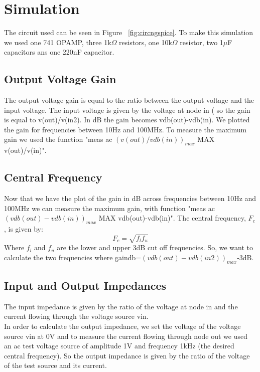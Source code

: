 \section{Simulation}
The circuit used can be seen in Figure ~\ref{fig:circngspice}. To make this simulation we used one  741 OPAMP, three 1k$\Omega$ resistors, one 10k$\Omega$ resistor, two 1$\mu$F capacitors ans one 220nF capacitor. 
\subsection{Output Voltage Gain}
The output voltage gain is equal to the ratio between the output voltage and the input voltage. The input voltage is given by the voltage at node in ( so the gain is equal to v(out)/v(in2). In dB the gain becomes vdb(out)-vdb(in). We plotted the gain for frequencies between 10Hz and 100MHz. To measure the maximum gain we used the function "meas ac $(v(out)/vdb(in))_{max}$ MAX v(out)/v(in)".
\subsection{Central Frequency}
Now that we have the plot of the gain in dB across frequencies between 10Hz and 100MHz we can measure the maximum gain, with function "meas ac $(vdb(out)-vdb(in))_{max}$ MAX vdb(out)-vdb(in)". The central frequency, $F_c$, is given by:
\begin{equation}
F_c=\sqrt{f_lf_u}
\end{equation}
Where $f_l$ and $f_u$ are the lower and upper 3dB cut off frequencies. So, we want to calculate the two frequencies where gaindb=$(vdb(out)-vdb(in2))_{max}$-3dB. 
\subsection{Input and Output Impedances}
The input impedance is given by the ratio of the voltage at node in and the current flowing through the voltage source vin. \\
In order to calculate the output impedance, we set the voltage of the voltage source vin at 0V and to measure the current flowing through node out we used an ac test voltage source of amplitude 1V and frequency 1kHz (the desired central frequency). So the output impedance is given by the ratio of the voltage of the test source and its current.
